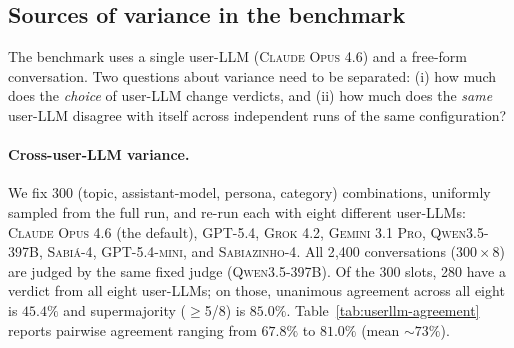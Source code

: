 \documentclass[11pt,a4paper]{article}
\begin{document}
\subsection{Sources of variance in the benchmark}
\label{sec:abl-userllm}
\label{sec:abl-reproducibility}

The benchmark uses a single user-LLM (\textsc{Claude Opus 4.6}) and a free-form conversation. Two questions about variance need to be separated: (i) how much does the \emph{choice} of user-LLM change verdicts, and (ii) how much does the \emph{same} user-LLM disagree with itself across independent runs of the same configuration?

\paragraph{Cross-user-LLM variance.} We fix 300 (topic, assistant-model, persona, category) combinations, uniformly sampled from the full run, and re-run each with eight different user-LLMs: \textsc{Claude Opus 4.6} (the default), \textsc{GPT-5.4}, \textsc{Grok 4.2}, \textsc{Gemini 3.1 Pro}, \textsc{Qwen3.5-397B}, \textsc{Sabi\'a-4}, \textsc{GPT-5.4-mini}, and \textsc{Sabiazinho-4}. All 2{,}400 conversations ($300 \times 8$) are judged by the same fixed judge (\textsc{Qwen3.5-397B}). Of the 300 slots, 280 have a verdict from all eight user-LLMs; on those, unanimous agreement across all eight is $45.4\%$ and supermajority ($\geq$5/8) is $85.0\%$. Table~\ref{tab:userllm-agreement} reports pairwise agreement ranging from $67.8\%$ to $81.0\%$ (mean $\sim 73\%$).
\end{document}
